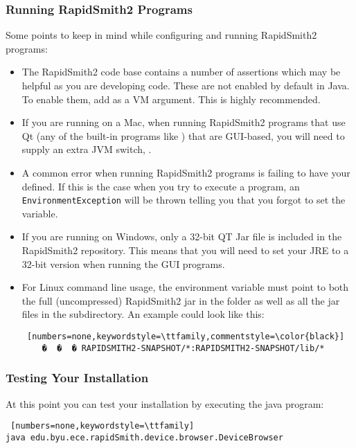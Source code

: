 \subsubsection{Running RapidSmith2 Programs}
Some points to keep in mind while configuring and running RapidSmith2 programs:
\begin{itemize}
  \item The RapidSmith2 code base contains a number of assertions which may be helpful  
  as you are developing code.  These are not enabled by default in Java.  To
  enable them, add  as a VM argument.  This is highly recommended.
  \item If you are running on a Mac, when running RapidSmith2 programs that use Qt  (any
  of the built-in programs like ) that are GUI-based, you
  will need to supply an extra JVM switch, .
  \item A common error when running RapidSmith2 programs is failing to have your
   defined.  If this is the case when you try to execute a
  program, an \texttt{EnvironmentException} will be thrown telling you that you
  forgot to set the variable.
  \item If you are running on Windows, only a 32-bit QT Jar file is included in
  the RapidSmith2 repository. This means that you will need to set your JRE to a 32-bit
  version when running the GUI programs. 
  \item For Linux command line usage, the  environment variable
  must point to both the full (uncompressed) RapidSmith2 jar in the 
  folder as well as all the jar files in the  subdirectory. An example
   could look like this:
\begin{lstlisting} [numbers=none,keywordstyle=\ttfamily,commentstyle=\color{black}] 
	�  �  � RAPIDSMITH2-SNAPSHOT/*:RAPIDSMITH2-SNAPSHOT/lib/*
\end{lstlisting}
\end{itemize}

\subsubsection{Testing Your Installation}
\noindent At this point you can test your installation by executing the java
 program: 

\begin{lstlisting} [numbers=none,keywordstyle=\ttfamily]
java edu.byu.ece.rapidSmith.device.browser.DeviceBrowser
\end{lstlisting} 

